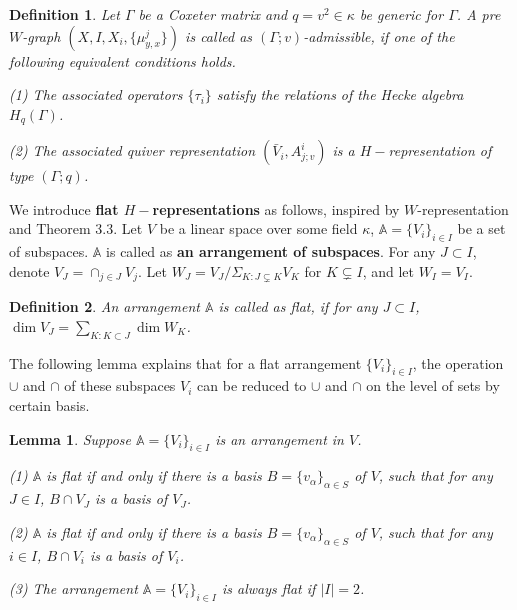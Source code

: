 \def\CTEXPreproc{Created by ctex v0.2.12, don't edit!}\documentclass[11pt]{article}
\newtheorem{lem}{Lemma}[section]
\newtheorem{defi}{Definition}[section]
\begin{document}
\begin{defi} Let $\Gamma$ be a Coxeter matrix and $q=v^2 \in \kappa $ be generic for $\Gamma$.
A pre $W$-graph $( X, I , X_i , \{ \mu^j _{y,x}  \}   )$ is called as $(\Gamma ;v)$-admissible, if one of the following equivalent conditions holds.

\noindent (1) The associated operators $\{ \tau_i  \} $ satisfy the relations of the Hecke algebra $H_q (\Gamma)$.

\noindent (2) The associated quiver representation $(\bar{V}_i ,A^i _{j;v} )$ is a $H-$representation of type $(\Gamma;q)$.

\end{defi}


 We introduce \textbf{flat $H-$representations} as follows, inspired by $W$-representation and Theorem 3.3.
Let $V$ be a linear space over some field $\kappa$, $\mathbb{A}=\{ V_i \}_{i\in I}$ be a set of subspaces. $\mathbb{A}$ is called as \textbf{an arrangement of subspaces}.
For any $J\subset I$, denote $V_{J} =\cap_{j\in J} V_j$. Let $W_J = V_J / \Sigma_{K: J\subsetneq K } V_K$ for $K\subsetneq I$, and
 let $W_I =V_I$.

\begin{defi}

An arrangement $\mathbb{A}$ is called as flat, if for any $J\subset I$, $\dim V_J = \sum _{K:K\subset J} \dim W_K $.

\end{defi}

The following lemma explains that for a flat arrangement $\{ V_i \} _{i\in I}$, the operation $\cup$ and $\cap$ of these subspaces $V_i$ can be reduced to $\cup$ and $\cap$ on the level of sets by certain basis.

\begin{lem}
 Suppose $ \mathbb{A}=\{  V_i   \}_{i\in I}  $ is an arrangement in $V$.

 \noindent (1) $\mathbb{A}$ is flat if and only if there is a basis $B= \{ v_{\alpha } \}_{\alpha \in S } $ of $V$, such that for any $J\in I$, $B \cap V_J $ is a basis of $V_J $.

\noindent (2) $\mathbb{A}$  is flat if and only if there is a basis $B= \{ v_{\alpha } \}_{\alpha \in S } $ of $V$, such that for any $i\in I$, $B \cap V_i$ is a basis of $V_i$.

 \noindent (3) The arrangement $ \mathbb{A}=\{  V_i   \}_{i\in I}  $ is always flat if  $|I|=2$.
 \end{lem}
\end{document}

